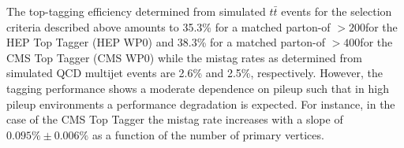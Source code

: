 The top-tagging efficiency determined from simulated $t\bar{t}$ events for the selection criteria described above amounts to 35.3\% for a matched parton-\pt of $> 200$\gev for the HEP Top Tagger (HEP WP0) and 38.3\% for a matched parton-\pt of $> 400$\gev for the CMS Top Tagger (CMS WP0) while the mistag rates as determined from simulated QCD multijet events are 2.6\% and 2.5\%, respectively. However, the tagging performance shows a moderate dependence on pileup such that in high pileup environments a performance degradation is expected. For instance, in the case of the CMS Top Tagger %
the mistag rate increases with a slope of $0.095\% \pm 0.006\%$ as a function of the number of primary vertices.       


